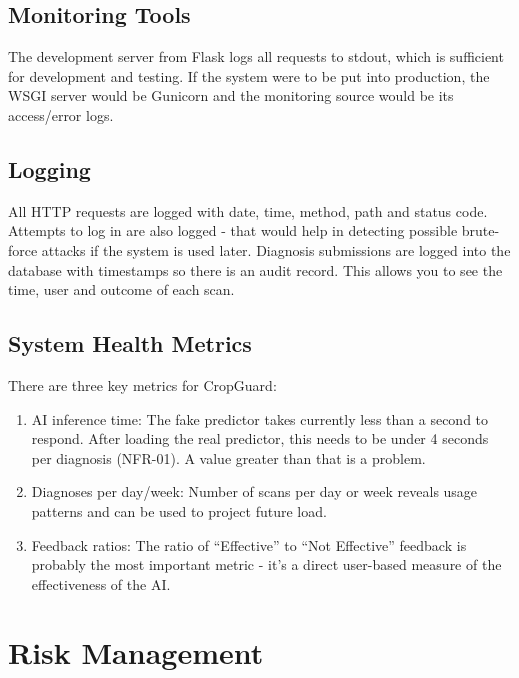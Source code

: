 \documentclass[12pt,a4paper]{article}
\begin{document}
\subsection{Monitoring Tools}

The development server from Flask logs all requests to stdout, which is sufficient for development and testing. If the system were to be put into production, the WSGI server would be Gunicorn and the monitoring source would be its access/error logs.

\subsection{Logging}

All HTTP requests are logged with date, time, method, path and status code. Attempts to log in are also logged - that would help in detecting possible brute-force attacks if the system is used later. Diagnosis submissions are logged into the database with timestamps so there is an audit record. This allows you to see the time, user and outcome of each scan.

\subsection{System Health Metrics}

There are three key metrics for CropGuard:

\begin{enumerate}[leftmargin=2em]
  \item AI inference time: The fake predictor takes currently less than a second to respond. After loading the real predictor, this needs to be under 4 seconds per diagnosis (NFR-01). A value greater than that is a problem.
  \item Diagnoses per day/week: Number of scans per day or week reveals usage patterns and can be used to project future load.
  \item Feedback ratios: The ratio of “Effective” to “Not Effective” feedback is probably the most important metric - it's a direct user-based measure of the effectiveness of the AI.
\end{enumerate}


\section{Risk Management}
\end{document}
